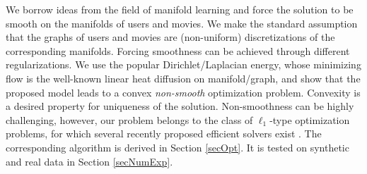 \documentclass{article}
\begin{document}
%
We borrow ideas from the field of manifold learning \cite{belkin2001laplacian,belkin2003laplacian} and force the solution to be smooth on the manifolds of users and movies. We make the standard assumption that the graphs of users and movies are (non-uniform) discretizations of the corresponding manifolds. Forcing smoothness can be achieved through different regularizations. We use the popular Dirichlet/Laplacian energy, whose minimizing flow is the well-known linear heat diffusion on manifold/graph, and show that the proposed model leads to a convex {\it non-smooth} optimization problem. Convexity is a desired property for uniqueness of the solution. Non-smoothness can be highly challenging, however, our problem belongs to the class of $\ell_1$-type optimization problems, for which several recently proposed efficient solvers exist \cite{boyd2011distributed,combettes2011proximal,nesterov2013first}.  The corresponding algorithm is derived in Section \ref{secOpt}. It is tested on synthetic and real data \cite{pro:Miller03MovieLens} in Section \ref{secNumExp}.




















\vspace{-0.1cm}
\end{document}
